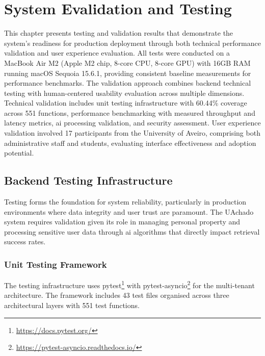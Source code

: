 \chapter{System Evalidation and Testing}
\label{chapter:testing_validation}

This chapter presents testing and validation results that demonstrate the system's readiness for production deployment through both technical performance validation and user experience evaluation. All tests were conducted on a MacBook Air M2 (Apple M2 chip, 8-core CPU, 8-core GPU) with 16GB RAM running macOS Sequoia 15.6.1, providing consistent baseline measurements for performance benchmarks. The validation approach combines backend technical testing with human-centered usability evaluation across multiple dimensions. Technical validation includes unit testing infrastructure with 60.44\% coverage across 551 functions, performance benchmarking with measured throughput and latency metrics, \ac{ai} processing validation, and security assessment. User experience validation involved 17 participants from the University of Aveiro, comprising both administrative staff and students, evaluating interface effectiveness and adoption potential.


\section{Backend Testing Infrastructure} \label{section:backend_testing}

Testing forms the foundation for system reliability, particularly in production environments where data integrity and user trust are paramount. The UAchado system requires validation given its role in managing personal property and processing sensitive user data through \ac{ai} algorithms that directly impact retrieval success rates.

\subsection{Unit Testing Framework} \label{subsection:unit_testing_framework}

The testing infrastructure uses pytest\footnote{\url{https://docs.pytest.org/}} with pytest-asyncio\footnote{\url{https://pytest-asyncio.readthedocs.io/}} for the multi-tenant architecture. The framework includes 43 test files organised across three architectural layers with 551 test functions.

